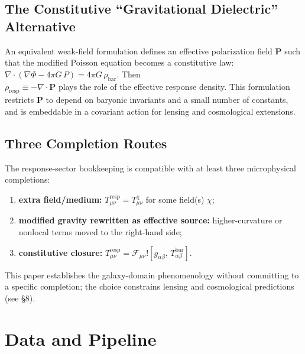 \documentclass[11pt]{article}
\begin{document}
\subsection{The Constitutive ``Gravitational Dielectric'' Alternative}\label{the-constitutive-gravitational-dielectric-alternative}

An equivalent weak-field formulation defines an effective polarization field \textbf{P} such that the modified Poisson equation becomes a constitutive law: \(\nabla \cdot (\nabla\Phi - 4\pi G\, P) = 4\pi G\,\rho_{\text{bar}}\). Then\\
\(\rho_{\text{resp}} \equiv - \nabla \cdot \mathbf{P}\) plays the role of the effective response density. This formulation restricts \textbf{P} to depend on baryonic invariants and a small number of constants, and is embeddable in a covariant action for lensing and cosmological extensions.

\subsection{Three Completion Routes}\label{three-completion-routes}

The response-sector bookkeeping is compatible with at least three microphysical completions:

\begin{enumerate}
\def\labelenumi{(\roman{enumi})}
\item
  \textbf{extra field/medium:} \(T_{\mu\nu}^{\text{resp}} = T_{\mu\nu}^{\chi}\) for some field(s) \(\chi\);
\item
  \textbf{modified gravity rewritten as effective source:} higher-curvature or nonlocal terms moved to the right-hand side;
\item
  \textbf{constitutive closure:} \(T_{\mu\nu}^{\text{resp}} = \mathcal{F}_{\mu\nu}\text{!}\left\lbrack g_{\alpha\beta},\, T_{\alpha\beta}^{\text{bar}} \right\rbrack\).
\end{enumerate}

This paper establishes the galaxy-domain phenomenology without committing to a specific completion; the choice constrains lensing and cosmological predictions (see §8).


\section{Data and Pipeline}\label{data-and-pipeline}
\end{document}
